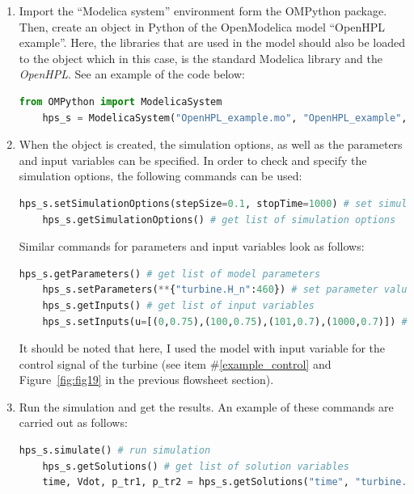 \documentclass[%
]{USN-PhD}
\begin{document}
\begin{enumerate}
    \item Import the ``Modelica system'' environment form the OMPython package. Then, create an object in Python of the OpenModelica model ``OpenHPL example''. Here, the libraries that are used in the model should also be loaded to the object which in this case, is the standard Modelica library and the \emph{OpenHPL}. See an example of the code below:
    \begin{lstlisting}[language = Python]
    from OMPython import ModelicaSystem
    hps_s = ModelicaSystem("OpenHPL_example.mo", "OpenHPL_example", ["Modelica", "OpenHPL/package.mo"])
    \end{lstlisting}
    \item When the object is created, the simulation options, as well as the parameters and input variables can be specified. In order to check and specify the simulation options, the following commands can be used:
    \begin{lstlisting}[language = Python]
    hps_s.setSimulationOptions(stepSize=0.1, stopTime=1000) # set simulation options
    hps_s.getSimulationOptions() # get list of simulation options
    \end{lstlisting}
    Similar commands for parameters and input variables look as follows:
    \begin{lstlisting}[language = Python]
    hps_s.getParameters() # get list of model parameters
    hps_s.setParameters(**{"turbine.H_n":460}) # set parameter value for the turbine nominal head
    hps_s.getInputs() # get list of input variables
    hps_s.setInputs(u=[(0,0.75),(100,0.75),(101,0.7),(1000,0.7)]) # set input value over time as a ramp signal
    \end{lstlisting}
    It should be noted that here, I used the model with input variable for the control signal of the turbine (see item \#\ref{example_control} and Figure~\ref{fig:fig19} in the previous flowsheet section).
    \item Run the simulation and get the results. An example of these commands are carried out as follows:
    \begin{lstlisting}[language = Python]
    hps_s.simulate() # run simulation
    hps_s.getSolutions() # get list of solution variables
    time, Vdot, p_tr1, p_tr2 = hps_s.getSolutions("time", "turbine.V_dot", "turbine.p_tr1", "turbine.p_tr2") # get results of simulation time variable, and the turbine flow rate, inlet and outlet pressures.
    \end{lstlisting}

\end{enumerate}
\end{document}
